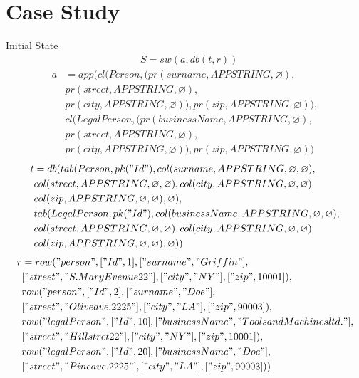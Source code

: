 \documentclass[11pt]{article}
\begin{document}
\section{Case Study}
\label{sec:caseStudy}
Initial State
\hline
\begin{align*}
&	S = sw(a, db(t,r))
\end{align*}
\begin{align*}
a &= app(cl(Person, (pr(surname, APPSTRING, \varnothing), \\
& pr(street, APPSTRING, \varnothing), \\
& pr(city, APPSTRING, \varnothing)), pr(zip, APPSTRING, \varnothing)), \\
& cl(LegalPerson, (pr(businessName, APPSTRING, \varnothing), \\
& pr(street, APPSTRING, \varnothing), \\
& pr(city, APPSTRING, \varnothing)), pr(zip, APPSTRING, \varnothing))
\end{align*}
\begin{align*}
t &= db(tab(Person, pk("Id"), col(surname, APPSTRING, \varnothing, \varnothing), \\
& col(street, APPSTRING, \varnothing, \varnothing), col(city, APPSTRING, \varnothing, \varnothing) \\
& col(zip, APPSTRING, \varnothing, \varnothing), \varnothing), \\
& tab(LegalPerson, pk("Id"),  col(businessName, APPSTRING, \varnothing, \varnothing), \\
& col(street, APPSTRING, \varnothing, \varnothing), col(city, APPSTRING, \varnothing, \varnothing) \\
& col(zip, APPSTRING, \varnothing, \varnothing), \varnothing)) 
\end{align*}
\begin{align*}
r &= row("person", ["Id", 1], ["surname", "Griffin"], \\
& ["street", "S. Mary Evenue 22"], ["city", "NY"], ["zip", 10001]), \\
& row("person", ["Id", 2], ["surname", "Doe"], \\
& ["street", "Olive ave. 2225"], ["city", "LA"], ["zip", 90003]), \\
& row("legalPerson", ["Id", 10], ["businessName", "Tools and Machines ltd."], \\
& ["street", "Hill stret 22"], ["city", "NY"], ["zip", 10001]), \\
& row("legalPerson", ["Id", 20], ["businessName", "Doe"], \\
& ["street", "Pine ave. 2225"], ["city", "LA"], ["zip", 90003]))
\end{align*}
\newpage
\end{document}
